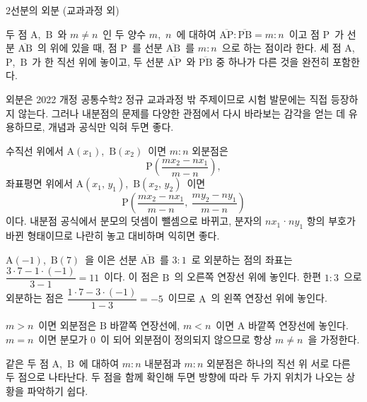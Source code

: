 \documentclass[10pt]{article}
\begin{document}
\begin{dmconcept}{2}{선분의 외분 (교과과정 외)}
\setlength{\parskip}{1.4mm plus 1.5mm minus 0mm}\linespread{1.20}\selectfont%


두 점 $\mathrm{A}$,\ $\mathrm{B}$\ 와 $m \ne n$\ 인 두 양수 $m$,\ $n$\ 에 대하여 $\overline{\mathrm{AP}} : \overline{\mathrm{PB}} = m : n$\ 이고 점 $\mathrm{P}$\ 가 선분 $\overline{\mathrm{AB}}$\ 의  위에 있을 때, 점 $\mathrm{P}$\ 를 선분 $\overline{\mathrm{AB}}$\ 를 $m : n$\ 으로 하는 점이라 한다. 세 점 $\mathrm{A}$,\ $\mathrm{P}$,\ $\mathrm{B}$\ 가 한 직선 위에 놓이고, 두 선분 $\overline{\mathrm{AP}}$\ 와 $\overline{\mathrm{PB}}$ 중 하나가 다른 것을 완전히 포함한다.

\begin{dmnote}
외분은 2022 개정 공통수학2 정규 교과과정 밖 주제이므로 시험 발문에는 직접 등장하지 않는다. 그러나 내분점의 문제를 다양한 관점에서 다시 바라보는 감각을 얻는 데 유용하므로, 개념과 공식만 익혀 두면 좋다.
\end{dmnote}


수직선 위에서 $\mathrm{A}(x_1)$,\ $\mathrm{B}(x_2)$\ 이면 $m : n$ 외분점은
\begin{equation*}
  \mathrm{P}\!\left( \frac{m x_2 - n x_1}{m - n} \right),
\end{equation*}
좌표평면 위에서 $\mathrm{A}(x_1,\, y_1)$,\ $\mathrm{B}(x_2,\, y_2)$\ 이면
\begin{equation*}
  \mathrm{P}\!\left( \frac{m x_2 - n x_1}{m - n},\ \frac{m y_2 - n y_1}{m - n} \right)
\end{equation*}
이다. 내분점 공식에서 분모의 덧셈이 뺄셈으로 바뀌고, 분자의 $n x_1$·$n y_1$ 항의 부호가 바뀐 형태이므로 나란히 놓고 대비하며 익히면 좋다.

\begin{dmexample}
$\mathrm{A}(-1)$,\ $\mathrm{B}(7)$\ 을 이은 선분 $\overline{\mathrm{AB}}$\ 를 $3 : 1$\ 로 외분하는 점의 좌표는 $\dfrac{3 \cdot 7 - 1 \cdot (-1)}{3 - 1} = 11$\ 이다. 이 점은 $\mathrm{B}$\ 의 오른쪽 연장선 위에 놓인다. 한편 $1 : 3$\ 으로 외분하는 점은 $\dfrac{1 \cdot 7 - 3 \cdot (-1)}{1 - 3} = -5$\ 이므로 $\mathrm{A}$\ 의 왼쪽 연장선 위에 놓인다.
\end{dmexample}


$m > n$\ 이면 외분점은 $\mathrm{B}$ 바깥쪽 연장선에, $m < n$\ 이면 $\mathrm{A}$ 바깥쪽 연장선에 놓인다. $m = n$\ 이면 분모가 $0$\ 이 되어 외분점이 정의되지 않으므로 항상 $m \ne n$\ 을 가정한다.

\begin{dmexplain}
같은 두 점 $\mathrm{A}$,\ $\mathrm{B}$\ 에 대하여 $m : n$ 내분점과 $m : n$ 외분점은 하나의 직선 위 서로 다른 두 점으로 나타난다. 두 점을 함께 확인해 두면 방향에 따라 두 가지 위치가 나오는 상황을 파악하기 쉽다.
\end{dmexplain}

\end{dmconcept}
\end{document}

